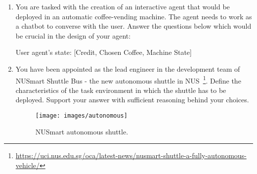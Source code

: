 \documentclass[12pt,letterpaper,pdftex]{report}
\theoremstyle{definition}
\begin{document}
\begin{enumerate}


\item You are tasked with the creation of an interactive agent that would be
deployed in an automatic coffee-vending machine. The agent needs to work as a
chatbot to converse with the user. Answer the questions below which would be
crucial in the design of your agent:


\begin{solution}
	User agent's state: [Credit, Chosen Coffee, Machine State]
\end{solution}


\item You have been appointed as the lead engineer in the development team of
NUSmart Shuttle Bus - the new autonomous shuttle in
NUS~\footnote{\url{https://uci.nus.edu.sg/oca/latest-news/nusmart-shuttle-a-fully-autonomous-vehicle/}}.
Define the characteristics of the task environment in which the shuttle has to
be deployed. Support your answer with sufficient reasoning behind your choices.
	

	
\begin{figure}[ht!]
	\centering
	\texttt{[image: images/autonomous]}
	\caption{NUSmart autonomous shuttle.}
	\label{autonomous}
\end{figure}


\end{enumerate}
\end{document}
